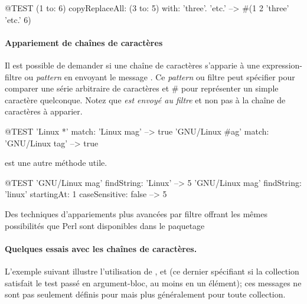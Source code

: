 \documentclass[a4paper,10pt,twoside]{book}
\begin{document}
\begin{code}{@TEST}
(1 to: 6) copyReplaceAll: (3 to: 5) with: { 'three'. 'etc.' } --> #(1 2 'three' 'etc.' 6)
\end{code}

\paragraph{Appariement de chaînes de caractères}

Il est possible de demander si une chaîne de caractères
s'apparie à  une expression-filtre ou \emph{pattern} en
envoyant le message .
Ce \emph{pattern} ou filtre peut spécifier \ct{*} pour
comparer une série arbitraire de caractères et \# 
pour représenter un simple caractère quelconque.
Notez que \emph{ est envoyé au filtre} et non pas à la chaîne
de caractères à apparier.
\begin{code}{@TEST}
'Linux *' match: 'Linux mag'           --> true
'GNU/Linux #ag' match: 'GNU/Linux tag' --> true
\end{code}

 est une autre méthode utile.
\begin{code}{@TEST}
'GNU/Linux mag' findString: 'Linux'                                                      --> 5
'GNU/Linux mag' findString: 'linux' startingAt: 1 caseSensitive: false  --> 5
\end{code}

Des techniques d'appariements plus avancées par filtre 
offrant les mêmes possibilités que Perl sont disponibles dans le
paquetage  %


\paragraph{Quelques essais avec les chaînes de caractères.} 
L'exemple suivant illustre l'utilisation de ,  et  
(ce dernier spécifiant si la collection satisfait le test passé en argument-bloc, au moins en un élément);
ces messages ne sont pas seulement définis pour  mais plus généralement pour toute collection.
\end{document}
